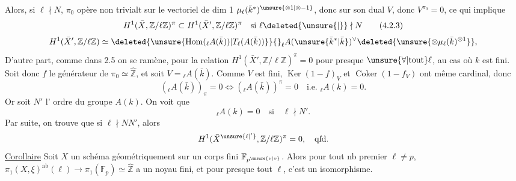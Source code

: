 Alors, si \deleted{\unsure{$\ell\nmid$}} $\ell\nmid N$,  $\pi_0$ opère non trivialt sur le   vectoriel de dim 1 $\mu_\ell(\bar k^*)^{\unsure{\otimes1|\otimes-1}}$, donc sur son dual $V$, donc  $V^{\pi_0}=0$, ce qui implique
\[H^1(\bar X,\mathbb Z/\ell\mathbb Z)^\pi\subset H^1(\bar X',\mathbb Z/\ell\mathbb Z)^\pi\quad\text{si }\ell\deleted{\unsure{\mid}}\nmid N\tag*{(4.2.3)}\]
\[H^1(\bar X',\mathbb Z/\ell\mathbb Z)\simeq\deleted{\unsure{\operatorname{Hom}({}_\ell A(\bar k))|T_\ell(A(\bar k))}}{}_{\ell}A(\unsure{\bar k^*|\bar k})^\vee\deleted{\unsure{\otimes\mu_\ell(\bar k)^{\otimes1}}},\]
D'autre part,  comme dans 2.5 on se ramène, pour la relation  $H^1(\bar X',\mathbb Z/\ell\mathbb Z)^\pi=0$ pour presque $\unsure{\forall|\text{tout}}\ell$, au cas où $k$ est fini.
  Soit donc  $f$ le générateur  de  $\pi_0\simeq\widehat{\mathbb Z}$, et soit $V={}_\ell A(\bar k)$. Comme $V$ est fini, $\operatorname{Ker}(1-f)_V$ et $\operatorname{Coker}(1-f_V)$ ont même cardinal, donc  
\[({}_\ell A(\bar k))_\pi=0\Longleftrightarrow({}_\ell A(\bar k))^\pi=0\quad\text{i.e. }{}_\ell A(k)=0.\]
Or soit $N'$ l' ordre du groupe  $A(k)$. On voit que 
\[{}_\ell A(k)=0\quad\text{si}\quad\ell\nmid N'.\]
Par suite, on trouve que si $\ell\nmid NN'$, alors
\[H^1(\bar X^{\unsure{\ell|'}},\mathbb Z/\ell\mathbb Z)^\pi=0,\quad\text{qfd.}\]
\uline{Corollaire}  Soit $X$ un schéma  géométriquement   sur un corps fini $\mathbb F_{p^{\unsure{\nu|v}}}$. Alors pour tout nb premier $\ell\neq p$,  $\pi_1(X,\xi)^{\mathrm{ab}}(\ell)\longrightarrow\pi_1(\mathbb F_p)\simeq\widehat{\mathbb Z}$  a un noyau fini, et pour presque tout $\ell$, c'est un isomorphisme.
